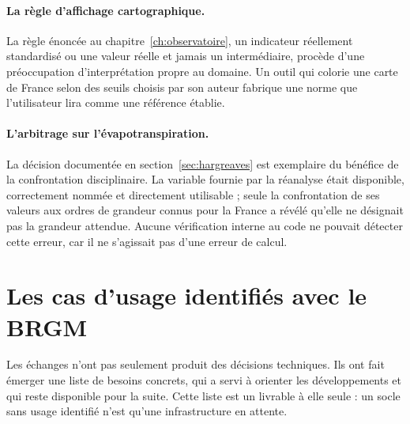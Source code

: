 \paragraph{La règle d'affichage cartographique.} La règle énoncée au
chapitre~\ref{ch:observatoire}, un indicateur réellement standardisé ou une valeur réelle et
jamais un intermédiaire, procède d'une préoccupation d'interprétation propre au domaine. Un
outil qui colorie une carte de France selon des seuils choisis par son auteur fabrique une norme
que l'utilisateur lira comme une référence établie.

\paragraph{L'arbitrage sur l'évapotranspiration.} La décision documentée en
section~\ref{sec:hargreaves} est exemplaire du bénéfice de la confrontation disciplinaire. La
variable fournie par la réanalyse était disponible, correctement nommée et directement
utilisable ; seule la confrontation de ses valeurs aux ordres de grandeur connus pour la France a
révélé qu'elle ne désignait pas la grandeur attendue. Aucune vérification interne au code ne
pouvait détecter cette erreur, car il ne s'agissait pas d'une erreur de calcul.

\section{Les cas d'usage identifiés avec le BRGM}

Les échanges n'ont pas seulement produit des décisions techniques. Ils ont fait émerger une
liste de besoins concrets, qui a servi à orienter les développements et qui reste disponible
pour la suite. Cette liste est un livrable à elle seule : un socle sans usage identifié n'est qu'une
infrastructure en attente.

